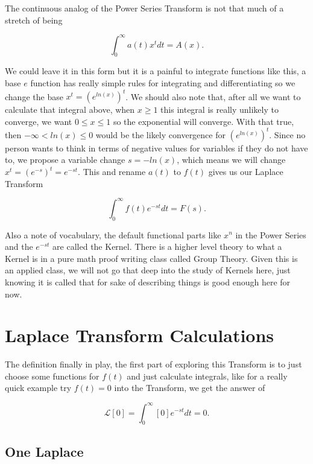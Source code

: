 \documentclass[12pt]{article}
\newcommand{\lp}{\mathscr{L}}
\begin{document}
The continuous analog of the Power Series Transform is not that much of a stretch of being

\begin{equation*}
    \int_0^{\infty} a(t)x^t dt = A(x).
\end{equation*}

We could leave it in this form but it is a painful to integrate functions like this, a base $e$ function has really simple rules for integrating and differentiating so we change the base $x^t=\left(e^{ln(x)}\right)^t$. We should also note that, after all we want to calculate that integral above, when $x \geq 1$ this integral is really unlikely to converge, we want $0 \leq x \leq 1$ so the exponential will converge. With that true, then $-\infty < ln(x) \leq 0$ would be the likely convergence for $\left(e^{ln(x)}\right)^t$. Since no person wants to think in terms of negative values for variables if they do not have to, we propose a variable change $s=-ln(x)$,  which means we will change $x^t=\left(e^{-s}\right)^t=e^{-st}$. This and rename $a(t)$ to $f(t)$ gives us our Laplace Transform

\begin{equation*}
     \int_0^{\infty} f(t) e^{-st} dt = F(s).
\end{equation*}

Also a note of vocabulary, the default functional parts like $x^n$ in the Power Series and the $e^{-st}$ are called the Kernel. There is a higher level theory to what a Kernel is in a pure math proof writing class called Group Theory. Given this is an applied class, we will not go that deep into the study of Kernels here, just knowing it is called that for sake of describing things is good enough here for now.

\section{Laplace Transform Calculations}

The definition finally in play, the first part of exploring this Transform is to just choose some functions for $f(t)$ and just calculate integrals, like for a really quick example try $f(t)=0$ into the Transform, we get the answer of

\begin{equation*}
     \lp[0]=\int_0^{\infty} [0]e^{-st} dt = 0.
\end{equation*}

\subsection{One Laplace}
\end{document}
